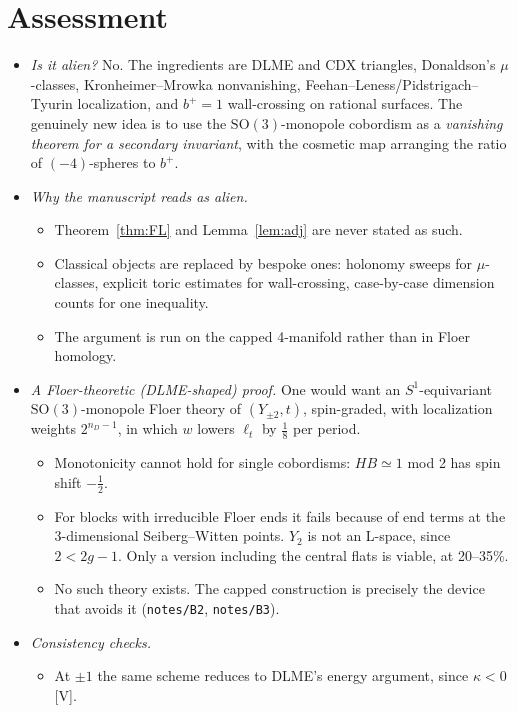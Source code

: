 \documentclass[10pt]{amsart}
\theoremstyle{definition}\newtheorem{definition}[theorem]{Definition}\newtheorem{remark}[theorem]{Remark}
\newcommand{\V}{\textsf{[V]}}\newcommand{\Pl}{\textsf{[P]}}\newcommand{\Sp}{\textsf{[S]}}
\begin{document}
\section{Assessment}
\begin{itemize}
\item \emph{Is it alien?} No. The ingredients are DLME and CDX triangles, Donaldson's $\mu$-classes, Kronheimer--Mrowka nonvanishing, Feehan--Leness/Pidstrigach--Tyurin localization, and $b^+=1$ wall-crossing on rational surfaces. The genuinely new idea is to use the $\mathrm{SO}(3)$-monopole cobordism as a \emph{vanishing theorem for a secondary invariant}, with the cosmetic map arranging the ratio of $(-4)$-spheres to $b^+$.
\item \emph{Why the manuscript reads as alien.}
\begin{itemize}
\item Theorem~\ref{thm:FL} and Lemma~\ref{lem:adj} are never stated as such.
\item Classical objects are replaced by bespoke ones: holonomy sweeps for $\mu$-classes, explicit toric estimates for wall-crossing, case-by-case dimension counts for one inequality.
\item The argument is run on the capped 4-manifold rather than in Floer homology.
\end{itemize}
\item \emph{A Floer-theoretic (DLME-shaped) proof.} One would want an $S^1$-equivariant $\mathrm{SO}(3)$-monopole Floer theory of $(Y_{\pm2},t)$, spin-graded, with localization weights $2^{n_D-1}$, in which $w$ lowers $\ell_t$ by $\tfrac18$ per period.
\begin{itemize}
\item Monotonicity cannot hold for single cobordisms: $HB\simeq1$ mod 2 has spin shift $-\tfrac12$.
\item For blocks with irreducible Floer ends it fails because of end terms at the 3-dimensional Seiberg--Witten points. $Y_2$ is not an L-space, since $2<2g-1$. Only a version including the central flats is viable, at 20--35\%.
\item No such theory exists. The capped construction is precisely the device that avoids it (\texttt{notes/B2}, \texttt{notes/B3}).
\end{itemize}
\item \emph{Consistency checks.}
\begin{itemize}
\item At $\pm1$ the same scheme reduces to DLME's energy argument, since $\kappa<0$ \V.

\end{itemize}
\end{itemize}
\end{document}

